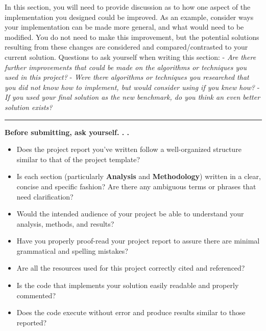 \documentclass[12pt]{article}
\begin{document}
In this section, you will need to provide discussion as to how one
aspect of the implementation you designed could be improved. As an
example, consider ways your implementation can be made more general, and
what would need to be modified. You do not need to make this
improvement, but the potential solutions resulting from these changes
are considered and compared/contrasted to your current solution.
Questions to ask yourself when writing this section: - \emph{Are there
further improvements that could be made on the algorithms or techniques
you used in this project?} - \emph{Were there algorithms or techniques
you researched that you did not know how to implement, but would
consider using if you knew how?} - \emph{If you used your final solution
as the new benchmark, do you think an even better solution exists?}

\begin{center}\rule{0.5\linewidth}{\linethickness}\end{center}

\textbf{Before submitting, ask yourself. . .}

\begin{itemize}
\item
  Does the project report you've written follow a well-organized
  structure similar to that of the project template?
\item
  Is each section (particularly \textbf{Analysis} and
  \textbf{Methodology}) written in a clear, concise and specific
  fashion? Are there any ambiguous terms or phrases that need
  clarification?
\item
  Would the intended audience of your project be able to understand your
  analysis, methods, and results?
\item
  Have you properly proof-read your project report to assure there are
  minimal grammatical and spelling mistakes?
\item
  Are all the resources used for this project correctly cited and
  referenced?
\item
  Is the code that implements your solution easily readable and properly
  commented?
\item
  Does the code execute without error and produce results similar to
  those reported?
\end{itemize}

\printbibliography
   
\end{document}
